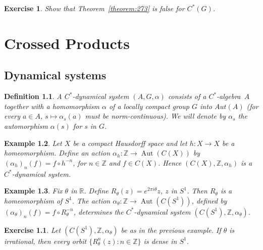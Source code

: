 \documentclass{book}
\newtheorem{definition}{Definition}[section]
\newtheorem{exercise}{Exercise}[section]
\newtheorem{example}[definition]{Example}
\def\cstar{\(C^*\)-algebra}
\begin{document}
\begin{exercise}
  Show that Theorem~\ref{theorem:273} is false for \(C^*(G)\).
\end{exercise}

\chapter{Crossed Products}\label{chapter:crossedproduct}
\section{Dynamical systems}

\begin{definition}
  A \textnormal{\(C^*\)-dynamical system} \((A, G, \alpha)\) consists of a \cstar\ 
  \(A\) together with a homomorphism \(\alpha\)
  of a locally compact group \(G\) into \(Aut(A)\) (for every \(a\in A\), \(s\longmapsto\alpha_s(a)\) must be norm-continuous). 
  We will denote by 
  \(\alpha_s\) the automorphism \(\alpha(s)\) for \(s\) in \(G\). 
\end{definition}
\begin{example}
  Let \(X\) be a compact Hausdorff space and let
  \(h:X\rightarrow X\)
  be a homeomorphism.
  Define an action \(\alpha_h:\mathbb Z\to\operatorname{Aut}(C(X))\) by
  \((\alpha_h)_n(f)=f\circ h^{-n}\), for \(n\in\mathbb Z\) and \(f\in C(X)\).
  Hence \((C(X),\mathbb{Z},\alpha_h)\)
  is a \(C^*\)-dynamical system.
\end{example}
\begin{example}
  Fix \(\theta\) in \(\mathbb{R}\).
  Define
  \(R_\theta(z)=e^{2\pi i\theta}z\),
  \(z\) in \(S^1\).
  Then \(R_\theta\) is a homeomorphism of \(S^1\).
  The action \(\alpha_\theta:\mathbb Z\to\operatorname{Aut}(C(S^1))\), defined by
  \((\alpha_\theta)_n(f)=f\circ R_\theta^{-n}\),
  determines the \(C^*\)-dynamical system
  \((C(S^1),\mathbb{Z},\alpha_\theta)\).
\end{example}
\begin{exercise}
  Let \((C(S^1),\mathbb{Z},\alpha_\theta)\) be as in the previous example. If \(\theta\) is irrational, then every orbit
  \(\{R_\theta^n(z):n\in\mathbb Z\}\)
  is dense in \(S^1\).
\end{exercise}
\end{document}
